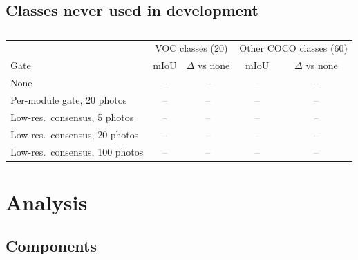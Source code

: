 \documentclass[runningheads]{llncs}
\newcommand{\x}{\textcolor{gray}{--}}          %
\newcommand{\figbox}[2]{\fbox{\parbox[c][#2][c]{0.95\linewidth}{\centering\small\textcolor{gray}{#1}}}}
\begin{document}
\subsection{Classes never used in development}
\label{sec:res-openvocab}

\begin{table}[t]
\centering
\caption{}
\label{tab:openvocab}
\footnotesize\setlength{\tabcolsep}{3.5pt}
\begin{tabular}{@{}lcccc@{}}
\toprule
 & \multicolumn{2}{c}{VOC classes (20)} & \multicolumn{2}{c}{Other COCO classes (60)} \\
\cmidrule(lr){2-3}\cmidrule(lr){4-5}
Gate & mIoU & $\Delta$ vs none & mIoU & $\Delta$ vs none \\
\midrule
None                                & \x & --  & \x & -- \\
Per-module gate, 20 photos          & \x & \x  & \x & \x \\
Low-res.\ consensus, 5 photos       & \x & \x  & \x & \x \\
Low-res.\ consensus, 20 photos      & \x & \x  & \x & \x \\
Low-res.\ consensus, 100 photos     & \x & \x  & \x & \x \\
\bottomrule
\end{tabular}
\end{table}

\begin{figure}[t]
\centering
\figbox{Per-class gain over no gate for the 60 other COCO classes, against the number of reference photos; seen classes as a reference.}{4cm}
\caption{}
\label{fig:openvocab}
\end{figure}

\section{Analysis}
\label{sec:analysis}

\subsection{Components}
\label{sec:ablation}
\end{document}
